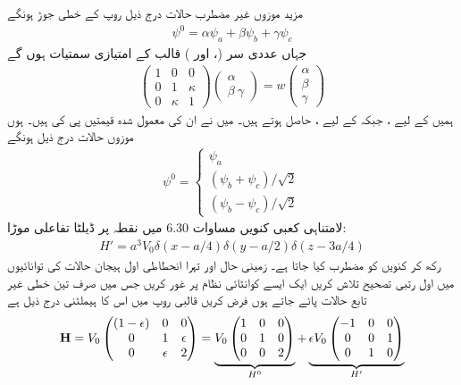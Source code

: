 مزید موزوں غیر مضطرب حالات درج ذیل روپ کے خطی جوڑ ہونگے 
\begin{align}
\psi^0 = \alpha \psi_a + \beta \psi_b + \gamma \psi_c 
\end{align}
جہاں عددی سر (،   اور )  قالب  کے امتیازی سمتیات  ہوں گے 
\begin{align*}
\begin{pmatrix}
1 & 0 & 0 \\
0 & 1 & \kappa \\
0 & \kappa & 1
\end{pmatrix}
\begin{pmatrix}
\alpha \\
\beta \
\gamma
\end{pmatrix}
= w 
\begin{pmatrix}
\alpha \\
\beta \\
\gamma
\end{pmatrix}
\end{align*}
ہمیں  کے لیے  ،  جبکہ   کے لیے ،  حاصل ہوتے ہیں۔ میں نے ان کی معمول شدہ قیمتیں پی کی ہیں۔ ہوں موزوں حالات درج ذیل ہونگے 
\begin{align}
\psi^0 =
\begin{cases}
\psi_a \\
(\psi_b + \psi_c)/ \sqrt{2} \\
(\psi_b - \psi_c)/ \sqrt{2}
\end{cases}
\end{align}
لامتناہی کعبی کنویں مساوات 6.30 میں نقطہ  پر ڈیلٹا تفاعلی موڑا:
\begin{align*}
H' = a^3 V_0 \delta (x - a/4) \delta (y - a/2) \delta (z - 3a/4)
\end{align*}
 رکھ کر کنویں کو مضطرب کیا جاتا ہے۔ زمینی حال اور تہرا انحطاطی اول ہیجان حالات کی توانائیوں میں اول رتبی تصحیح تلاش کریں
\انتہا{سوال}
ایک ایسے کوانٹائی نظام پر غور کریں جس میں صرف تین خطی غیر تابع حالات پائے جاتے ہوں فرض کریں قالبی روپ میں اس کا ہیملٹنی درج ذیل ہے
\begin{align*}
\bold{H} = V_0 
\begin{pmatrix}
(1 - \epsilon) & 0 & 0 \\
0 & 1 & \epsilon \\
0 & \epsilon & 2
\end{pmatrix}
= \underbrace{V_0 
\begin{pmatrix}
1 & 0 & 0 \\
0 & 1 & 0 \\
0 & 0 & 2
\end{pmatrix}}_{H^0} 
+ \underbrace{\epsilon V_0 
\begin{pmatrix}
-1 & 0 & 0 \\
0 & 0 & 1 \\
0 & 1 & 0
\end{pmatrix}}_{H'}
\end{align*}
